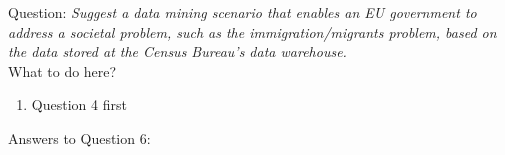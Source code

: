 Question:
\emph{
    Suggest a data mining scenario that enables an EU government to address a societal
problem, such as the immigration/migrants problem, based on the data stored at the
Census Bureau’s data warehouse.
}\\

What to do here?
\begin{enumerate}
    \item Question 4 first
  \end{enumerate}

Answers to Question 6:

